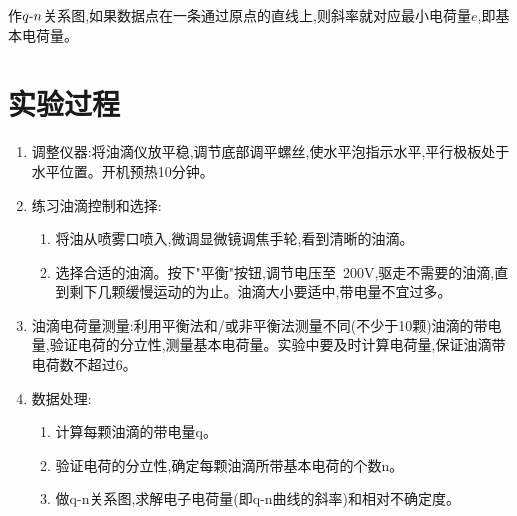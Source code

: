 \documentclass[UTF8]{ctexart}
\begin{document}
作$q\textup{-}n$关系图,如果数据点在一条通过原点的直线上,则斜率就对应最小电荷量$e$,即基本电荷量。


\section{实验过程}
\begin{enumerate}
    \item 调整仪器:将油滴仪放平稳,调节底部调平螺丝,使水平泡指示水平,平行极板处于水平位置。开机预热10分钟。
    \item 练习油滴控制和选择:
    \begin{enumerate}
      \item 将油从喷雾口喷入,微调显微镜调焦手轮,看到清晰的油滴。
      \item 选择合适的油滴。按下"平衡"按钮,调节电压至~200V,驱走不需要的油滴,直到剩下几颗缓慢运动的为止。油滴大小要适中,带电量不宜过多。
    \end{enumerate}
    \item 油滴电荷量测量:利用平衡法和/或非平衡法测量不同(不少于10颗)油滴的带电量,验证电荷的分立性,测量基本电荷量。实验中要及时计算电荷量,保证油滴带电荷数不超过6。
    \item 数据处理:
    \begin{enumerate} 
      \item 计算每颗油滴的带电量q。
      \item 验证电荷的分立性,确定每颗油滴所带基本电荷的个数n。
      \item 做q-n关系图,求解电子电荷量(即q-n曲线的斜率)和相对不确定度。
    \end{enumerate}
  \end{enumerate}
\end{document}
